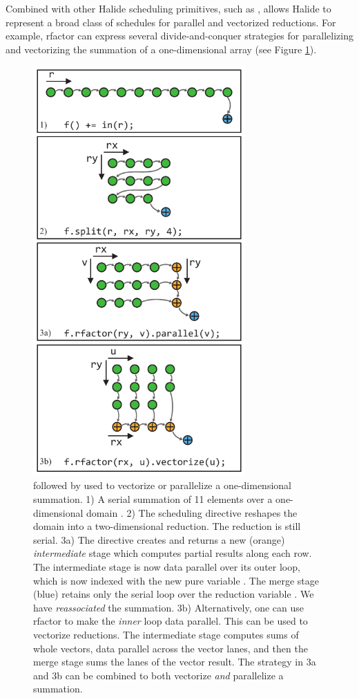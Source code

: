 Combined with other Halide scheduling primitives, such as ,  allows Halide to represent a broad class of schedules for parallel and vectorized reductions. For example, rfactor can express several divide-and-conquer strategies for parallelizing and vectorizing the summation of a one-dimensional array (see Figure \ref{fig:rfactor}).

\begin{figure}
\centering
\includegraphics[width=3.2in]{rfactor}
\caption{
 followed by  used to vectorize or parallelize a one-dimensional summation. 1) A serial summation of 11 elements over a one-dimensional domain . 2) The  scheduling directive reshapes the domain into a two-dimensional reduction. The reduction is still serial. 3a) The  directive creates and returns a new (orange) \emph{intermediate} stage which computes partial results along each row. The intermediate stage is now data parallel over its outer loop, which is now indexed with the new pure variable . The merge stage (blue) retains only the serial loop over the reduction variable . We have \emph{reassociated} the summation. 3b) Alternatively, one can use rfactor to make the \emph{inner} loop data parallel. This can be used to vectorize reductions. The intermediate stage computes sums of whole vectors, data parallel across the vector lanes, and then the merge stage sums the lanes of the vector result. The strategy in 3a and 3b can be combined to both vectorize \emph{and} parallelize a summation.
}
\label{fig:rfactor}
\end{figure}

